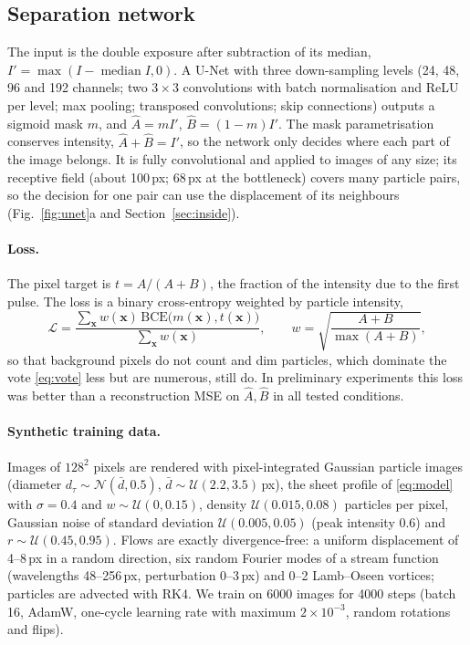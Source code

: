 \documentclass[11pt]{article}
\theoremstyle{remark}
\newcommand{\x}{\mathbf{x}}
\begin{document}
\subsection{Separation network}
The input is the double exposure after subtraction of its median, $I'=\max(I-\operatorname{median}I,0)$.
A U-Net \citep{ronneberger2015} with three down-sampling levels (24, 48, 96 and 192 channels; two $3\times3$ convolutions with batch normalisation and ReLU per level; max pooling; transposed convolutions; skip connections) outputs a sigmoid mask $m$, and $\hat A=mI'$, $\hat B=(1-m)I'$.
The mask parametrisation conserves intensity, $\hat A+\hat B=I'$, so the network only decides where each part of the image belongs.
It is fully convolutional and applied to images of any size; its receptive field (about 100\,px; 68\,px at the bottleneck) covers many particle pairs, so the decision for one pair can use the displacement of its neighbours (Fig.~\ref{fig:unet}a and Section~\ref{sec:inside}).

\paragraph{Loss.}
The pixel target is $t=A/(A+B)$, the fraction of the intensity due to the first pulse.
The loss is a binary cross-entropy weighted by particle intensity,
\begin{equation}
\mathcal L=\frac{\sum_\x w(\x)\,\mathrm{BCE}\bigl(m(\x),t(\x)\bigr)}{\sum_\x w(\x)},\qquad w=\sqrt{\frac{A+B}{\max(A+B)}},
\end{equation}
so that background pixels do not count and dim particles, which dominate the vote \eqref{eq:vote} less but are numerous, still do.
In preliminary experiments this loss was better than a reconstruction MSE on $\hat A,\hat B$ in all tested conditions.

\paragraph{Synthetic training data.}
Images of $128^2$ pixels are rendered with pixel-integrated Gaussian particle images (diameter $d_\tau\sim\mathcal N(\bar d,0.5)$, $\bar d\sim\mathcal U(2.2,3.5)$\,px), the sheet profile of \eqref{eq:model} with $\sigma=0.4$ and $w\sim\mathcal U(0,0.15)$, density $\mathcal U(0.015,0.08)$ particles per pixel, Gaussian noise of standard deviation $\mathcal U(0.005,0.05)$ (peak intensity 0.6) and $r\sim\mathcal U(0.45,0.95)$.
Flows are exactly divergence-free: a uniform displacement of 4--8\,px in a random direction, six random Fourier modes of a stream function (wavelengths 48--256\,px, perturbation 0--3\,px) and 0--2 Lamb--Oseen vortices; particles are advected with RK4.
We train on 6000 images for 4000 steps (batch 16, AdamW, one-cycle learning rate with maximum $2\times10^{-3}$, random rotations and flips).
\end{document}
